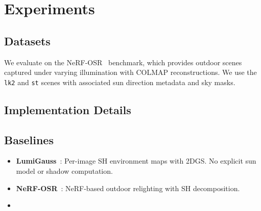 \section{Experiments}
\label{sec:experiments}

\subsection{Datasets}

We evaluate on the NeRF-OSR~\cite{rudnev2022nerfOSR} benchmark, which provides outdoor scenes captured under varying illumination with COLMAP reconstructions.
We use the \texttt{lk2} and \texttt{st} scenes with associated sun direction metadata and sky masks.

\subsection{Implementation Details}

\todo{}


\subsection{Baselines}

\begin{itemize}
    \item \textbf{LumiGauss}~\cite{joaxkal2024lumigauss}: Per-image SH environment maps with 2DGS. No explicit sun model or shadow computation.
    \item \textbf{NeRF-OSR}~\cite{rudnev2022nerfOSR}: NeRF-based outdoor relighting with SH decomposition.
    \item {}
\end{itemize}

